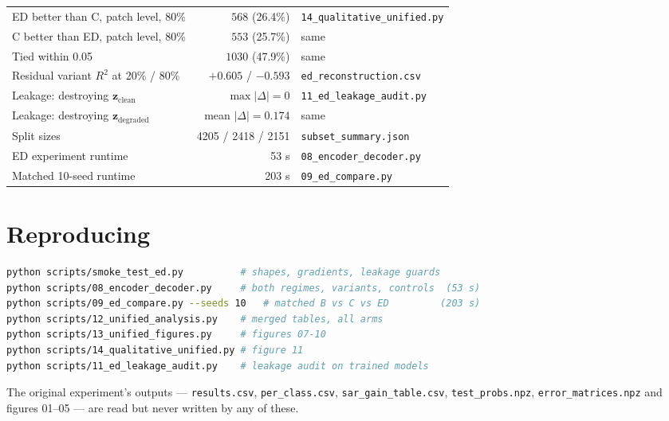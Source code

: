 \documentclass[11pt,a4paper]{report}
\newcommand{\file}[1]{\texttt{\small #1}}
\newcommand{\zc}{\mathbf{z}_{\text{clean}}}
\newcommand{\zd}{\mathbf{z}_{\text{degraded}}}
\begin{document}
\begin{center}
\begin{longtable}{@{}p{6.9cm}rp{5.6cm}@{}}
ED better than C, patch level, 80\% & $568$ (26.4\%) & \file{14\_qualitative\_unified.py} \\
C better than ED, patch level, 80\% & $553$ (25.7\%) & same \\
Tied within 0.05 & $1030$ (47.9\%) & same \\
Residual variant $R^2$ at 20\% / 80\% & $+0.605$ / $-0.593$ & \file{ed\_reconstruction.csv} \\
Leakage: destroying $\zc$ & $\max|\Delta| = 0$ & \file{11\_ed\_leakage\_audit.py} \\
Leakage: destroying $\zd$ & mean $|\Delta| = 0.174$ & same \\
Split sizes & 4205 / 2418 / 2151 & \file{subset\_summary.json} \\
ED experiment runtime & 53 s & \file{08\_encoder\_decoder.py} \\
Matched 10-seed runtime & 203 s & \file{09\_ed\_compare.py} \\
\bottomrule
\end{longtable}
\end{center}

\section*{Reproducing}

\begin{lstlisting}[language=bash]
python scripts/smoke_test_ed.py          # shapes, gradients, leakage guards
python scripts/08_encoder_decoder.py     # both regimes, variants, controls  (53 s)
python scripts/09_ed_compare.py --seeds 10   # matched B vs C vs ED         (203 s)
python scripts/12_unified_analysis.py    # merged tables, all arms
python scripts/13_unified_figures.py     # figures 07-10
python scripts/14_qualitative_unified.py # figure 11
python scripts/11_ed_leakage_audit.py    # leakage audit on trained models
\end{lstlisting}

The original experiment's outputs --- \file{results.csv}, \file{per\_class.csv},
\file{sar\_gain\_table.csv}, \file{test\_probs.npz}, \file{error\_matrices.npz} and
figures 01--05 --- are read but never written by any of these.
\end{document}
